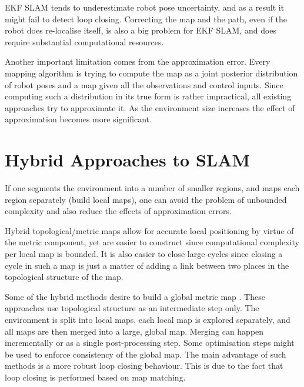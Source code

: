 EKF SLAM tends to underestimate robot pose uncertainty, and as a
result it might fail to detect loop closing. Correcting the map and
the path, even if the robot does re-localise itself, is also a big
problem for EKF SLAM, and does require substantial computational
resources.

Another important limitation comes from the approximation error. Every
mapping algorithm is trying to compute the map as a joint posterior
distribution of robot poses and a map given all the observations and
control inputs. Since computing such a distribution in its true form
is rather impractical, all existing approaches try to approximate it.
As the environment size increases the effect of approximation becomes
more significant.



\section{Hybrid Approaches to SLAM} 

If one segments the environment into a number of smaller regions, and
maps each region separately (build local maps), one can avoid the
problem of unbounded complexity and also reduce the effects of
approximation errors.

Hybrid topological/metric maps
\cite{fergusson2003,bosse03atlas,Thrun98a} allow for accurate local
positioning by virtue of the metric component, yet are easier to
construct since computational complexity per local map is bounded. It
is also easier to close large cycles since closing a cycle in such a
map is just a matter of adding a link between two places in the
topological structure of the map.


Some of the hybrid methods desire to build a global metric map
\cite{Thrun98a, slam_thrun98b}. These approaches use topological
structure as an intermediate step only. The environment is split into
local maps, each local map is explored separately, and all maps are
then merged into a large, global map. Merging can happen incrementally
or as a single post-processing step. Some optimisation steps might be
used to enforce consistency of the global map. The main advantage of
such methods is a more robust loop closing behaviour. This is due to
the fact that loop closing is performed based on map matching.

